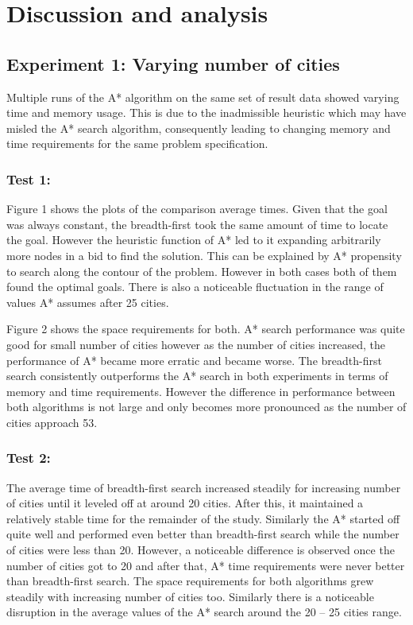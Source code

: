 \documentclass[letterpaper]{article}
\begin{document}
\section{Discussion and analysis}
\subsection{Experiment 1: Varying number of cities}
Multiple runs of the A* algorithm on the same set of result data showed varying time and memory
usage. This is due to the inadmissible heuristic which may have misled the A* search algorithm, consequently leading to changing memory and time requirements for the same problem specification. 
\subsubsection{Test 1:} 
Figure 1 shows the plots of the comparison average times. Given that the goal was always constant, the breadth-first took the same amount of time to locate the goal. However the heuristic function of A* led to it expanding arbitrarily more nodes in a bid to find the solution. This can be explained by A* propensity to search along the contour of the problem. However in both cases both of them found the optimal goals.
There is also a noticeable fluctuation in the range of values A* assumes after 25 cities.

Figure 2 shows the space requirements for both. A* search performance was quite good for small number of cities however as the number of cities increased, the performance of A* became more erratic and became worse. 
The breadth-first search consistently outperforms the A* search in both experiments in terms of
memory and time requirements. However the difference in performance between both algorithms is not
large and only becomes more pronounced as the number of cities approach 53.

\subsubsection{Test 2:}
The average time of breadth-first search increased steadily for increasing number of cities until it
leveled off at around 20 cities. After this, it maintained a relatively stable time for the remainder of the
study.
Similarly the A* started off quite well and performed even better than breadth-first search while the
number of cities were less than 20. However, a noticeable difference is observed once the number of cities got to 20 and after that, A* time requirements were never better than breadth-first search.
The space requirements for both algorithms grew steadily with increasing number of cities too.
Similarly there is a noticeable disruption in the average values of the A* search around the 20 – 25
cities range.
\end{document}
